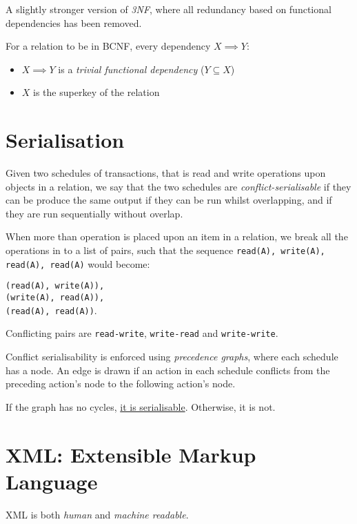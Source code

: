 \documentclass{article}
\begin{document}
A slightly stronger version of \textit{3NF}, where all redundancy based on functional dependencies has been removed.

For a relation to be in BCNF, every dependency $X \implies Y$:

\begin{itemize}
\item 
  $X \implies Y$ is a \textit{trivial functional dependency} ($Y \subseteq X$)
\item
  $X$ is the superkey of the relation
\end{itemize}

\section{Serialisation}

Given two schedules of transactions, that is read and write operations upon objects in a relation, we say that the two schedules are \textit{conflict-serialisable} if they can be produce the same output if they can be run whilst overlapping, and if they are run sequentially without overlap.

When more than operation is placed upon an item in a relation, we break all the operations in to a list of pairs, such that the sequence \texttt{read(A), write(A), read(A), read(A)} would become:

\texttt{(read(A), write(A)),\\ (write(A), read(A)),\\ (read(A), read(A))}.

Conflicting pairs are \texttt{read-write}, \texttt{write-read} and \texttt{write-write}. 

Conflict serialisability is enforced using \textit{precedence graphs}, where each schedule has a node. An edge is drawn if an action in each schedule conflicts from the preceding action's node to the following action's node.

If the graph has no cycles, \underline{it is serialisable}. Otherwise, it is not.

\section{XML: Extensible Markup Language}

XML is both \textit{human} and \textit{machine readable}.
\end{document}
